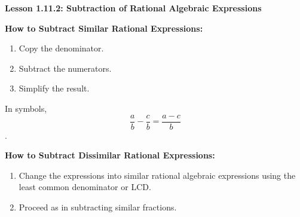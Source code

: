 \begin{center}
\textbf{Lesson 1.11.2: Subtraction of Rational Algebraic Expressions}
\end{center}

 
\textbf{How to Subtract Similar Rational Expressions:}
\begin{enumerate} 
	\item Copy the denominator. 
	\item Subtract the numerators.  
	\item Simplify the result. 
\end{enumerate}
In symbols, 
\vspace*{-0.5ex}
$$ \displaystyle  \frac{a}{b} -  \frac{c}{b} =  \frac{a-c}{b} $$.
\vspace*{-3ex}

\textbf{How to Subtract Dissimilar Rational Expressions:}
\begin{enumerate} 
	\item Change the expressions into similar rational algebraic expressions using the least common denominator  or  LCD.  
	\item Proceed as in subtracting similar fractions.  
\end{enumerate}


